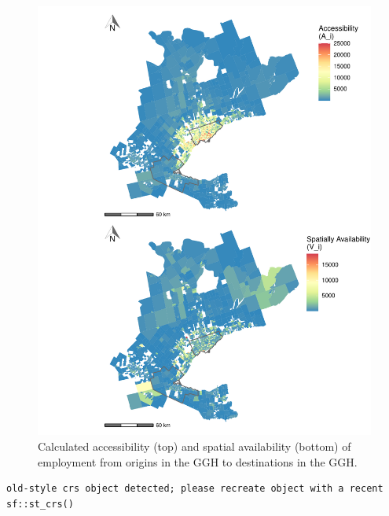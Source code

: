 \documentclass[]{elsarticle} %
\begin{document}
\begin{figure}
\includegraphics[width=1\linewidth]{Spatial-Availability_files/figure-latex/plot-access-SA-GGH-1} \caption{\label{fig:plot-access-SA-GGH-TTS}Calculated accessibility (top) and spatial availability (bottom) of employment from origins in the GGH to destinations in the GGH.}\label{fig:plot-access-SA-GGH}
\end{figure}

\begin{verbatim}
old-style crs object detected; please recreate object with a recent sf::st_crs()
\end{verbatim}
\end{document}

